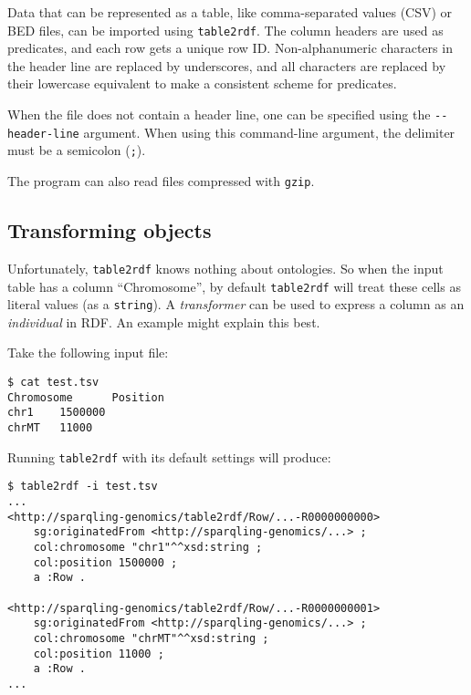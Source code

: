   Data that can be represented as a table, like comma-separated values (CSV)
  or BED files, can be imported using \texttt{table2rdf}.  The column headers
  are used as predicates, and each row gets a unique row ID.  Non-alphanumeric
  characters in the header line are replaced by underscores, and all characters
  are replaced by their lowercase equivalent to make a consistent scheme for
  predicates.

  When the file does not contain a header line, one can be specified using the
  \texttt{-{}-header-line} argument.  When using this command-line argument, the
  delimiter must be a semicolon (\texttt{;}).

  The program can also read files compressed with \texttt{gzip}.

\subsection{Transforming objects}

  Unfortunately, \texttt{table2rdf} knows nothing about ontologies.  So when
  the input table has a column ``Chromosome'', by default \texttt{table2rdf}
  will treat these cells as literal values (as a \texttt{string}).  A
  \emph{transformer} can be used to express a column as an \emph{individual} in
  RDF.  An example might explain this best.

  Take the following input file:
\begin{siderules}
\begin{verbatim}
$ cat test.tsv
Chromosome      Position
chr1    1500000
chrMT   11000
\end{verbatim}
\end{siderules}

  Running \texttt{table2rdf} with its default settings will produce:

\begin{siderules}
\begin{verbatim}
$ table2rdf -i test.tsv
...
<http://sparqling-genomics/table2rdf/Row/...-R0000000000>
    sg:originatedFrom <http://sparqling-genomics/...> ;
    col:chromosome "chr1"^^xsd:string ;
    col:position 1500000 ;
    a :Row .

<http://sparqling-genomics/table2rdf/Row/...-R0000000001>
    sg:originatedFrom <http://sparqling-genomics/...> ;
    col:chromosome "chrMT"^^xsd:string ;
    col:position 11000 ;
    a :Row .
...
\end{verbatim}
\end{siderules}

